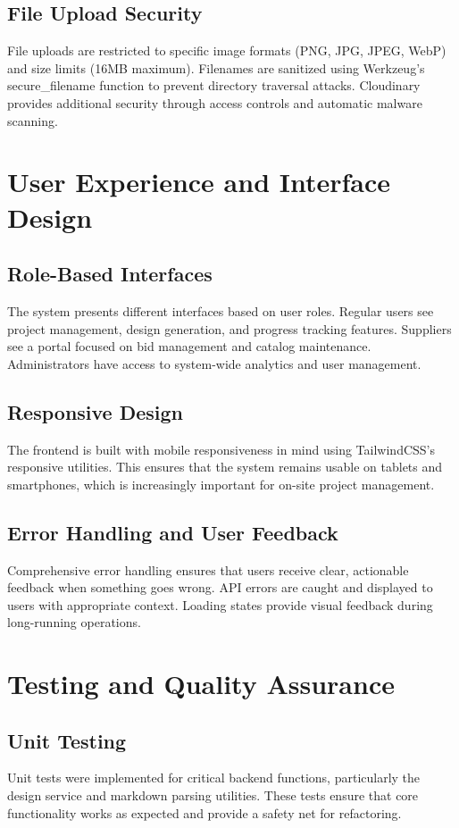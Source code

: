 \documentclass[conference]{IEEEtran}
\begin{document}
\subsection{File Upload Security}
File uploads are restricted to specific image formats (PNG, JPG, JPEG, WebP) and size limits (16MB maximum). Filenames are sanitized using Werkzeug's secure\_filename function to prevent directory traversal attacks. Cloudinary provides additional security through access controls and automatic malware scanning.

\section{User Experience and Interface Design}

\subsection{Role-Based Interfaces}
The system presents different interfaces based on user roles. Regular users see project management, design generation, and progress tracking features. Suppliers see a portal focused on bid management and catalog maintenance. Administrators have access to system-wide analytics and user management.

\subsection{Responsive Design}
The frontend is built with mobile responsiveness in mind using TailwindCSS's responsive utilities. This ensures that the system remains usable on tablets and smartphones, which is increasingly important for on-site project management.

\subsection{Error Handling and User Feedback}
Comprehensive error handling ensures that users receive clear, actionable feedback when something goes wrong. API errors are caught and displayed to users with appropriate context. Loading states provide visual feedback during long-running operations.

\section{Testing and Quality Assurance}

\subsection{Unit Testing}
Unit tests were implemented for critical backend functions, particularly the design service and markdown parsing utilities. These tests ensure that core functionality works as expected and provide a safety net for refactoring.
\end{document}
